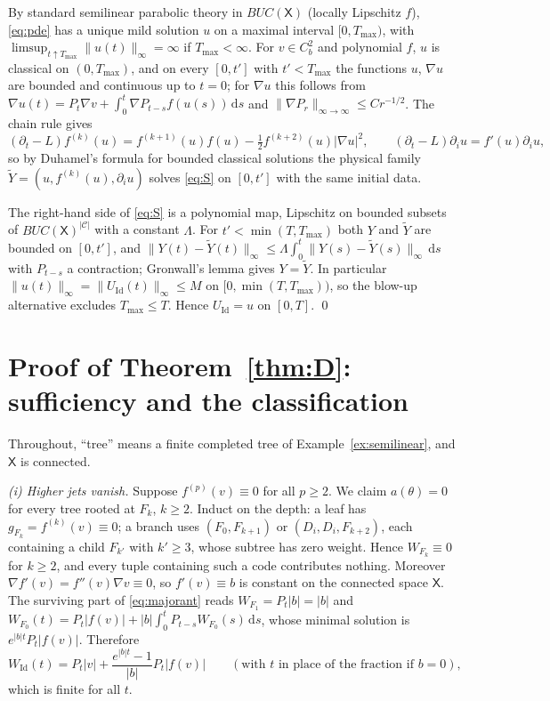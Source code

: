 \documentclass[11pt]{article}
\theoremstyle{definition}
\theoremstyle{remark}
\newcommand{\X}{\mathsf{X}}
\newcommand{\C}{\mathcal{C}}
\newcommand{\Id}{\mathrm{Id}}
\newcommand{\dd}{\,\mathrm{d}}
\begin{document}
By standard semilinear parabolic theory in $BUC(\X)$ (locally Lipschitz
$f$), \eqref{eq:pde} has a unique mild solution $u$ on a maximal interval
$[0,T_{\max})$, with $\limsup_{t\uparrow T_{\max}}\|u(t)\|_\infty=\infty$
if $T_{\max}<\infty$. For $v\in C^2_b$ and polynomial $f$, $u$ is classical
on $(0,T_{\max})$, and on every $[0,t']$ with $t'<T_{\max}$ the functions
$u$, $\nabla u$ are bounded and continuous up to $t=0$; for $\nabla u$ this
follows from $\nabla u(t)=P_t\nabla v+\int_0^t\nabla P_{t-s}f(u(s))\dd s$
and $\|\nabla P_r\|_{\infty\to\infty}\le Cr^{-1/2}$. The chain rule gives
\[
(\partial_t-L)f^{(k)}(u)=f^{(k+1)}(u)f(u)-\tfrac12f^{(k+2)}(u)|\nabla u|^2,
\qquad (\partial_t-L)\partial_iu=f'(u)\partial_iu,
\]
so by Duhamel's formula for bounded classical solutions the physical
family $\tilde Y=(u,f^{(k)}(u),\partial_iu)$ solves \eqref{eq:S} on
$[0,t']$ with the same initial data.

The right-hand side of \eqref{eq:S} is a polynomial map, Lipschitz on
bounded subsets of $BUC(\X)^{|\C|}$ with a constant $\Lambda$. For
$t'<\min(T,T_{\max})$ both $Y$ and $\tilde Y$ are bounded on $[0,t']$, and
$\|Y(t)-\tilde Y(t)\|_\infty\le\Lambda\int_0^t\|Y(s)-\tilde Y(s)\|_\infty
\dd s$ with $P_{t-s}$ a contraction; Gronwall's lemma gives $Y=\tilde Y$.
In particular $\|u(t)\|_\infty=\|U_\Id(t)\|_\infty\le M$ on
$[0,\min(T,T_{\max}))$, so the blow-up alternative excludes
$T_{\max}\le T$. Hence $U_\Id=u$ on $[0,T]$. \qed

\section{Proof of Theorem~\ref{thm:D}: sufficiency and the
classification}\label{app:D}

Throughout, ``tree'' means a finite completed tree of
Example~\ref{ex:semilinear}, and $\X$ is connected.

\emph{(i) Higher jets vanish.} Suppose $f^{(p)}(v)\equiv0$ for all
$p\ge2$. We claim $a(\theta)=0$ for every tree rooted at $F_k$, $k\ge2$.
Induct on the depth: a leaf has $g_{F_k}=f^{(k)}(v)\equiv0$; a branch uses
$(F_0,F_{k+1})$ or $(D_i,D_i,F_{k+2})$, each containing a child $F_{k'}$
with $k'\ge3$, whose subtree has zero weight. Hence $W_{F_k}\equiv0$ for
$k\ge2$, and every tuple containing such a code contributes nothing.
Moreover $\nabla f'(v)=f''(v)\nabla v\equiv0$, so $f'(v)\equiv b$ is
constant on the connected space $\X$. The surviving part of
\eqref{eq:majorant} reads $W_{F_1}=P_t|b|=|b|$ and
$W_{F_0}(t)=P_t|f(v)|+|b|\int_0^tP_{t-s}W_{F_0}(s)\dd s$, whose minimal
solution is $e^{|b|t}P_t|f(v)|$. Therefore
\[
W_\Id(t)=P_t|v|+\frac{e^{|b|t}-1}{|b|}P_t|f(v)|
\qquad(\text{with }t\text{ in place of the fraction if }b=0),
\]
which is finite for all $t$.
\end{document}

